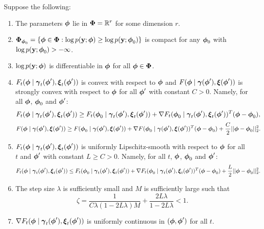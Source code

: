 \begin{theorem}

    Suppose the following:
    
    \begin{enumerate}
        \item The parameters $\bfphi$ lie in $\bfPhi = \bbR^r$ for some dimension $r$.
        \item $\bfPhi_{\bfphi_0} = \{\bfphi \in \bfPhi: \log p(\bfy;\bfphi) \geq \log p(\bfy;\bfphi_0)\}$ is compact for any  $\bfphi_0$ with $\log p(\bfy;\bfphi_0) > -\infty$.
        \item $\log p(\bfy;\bfphi)$ is differentiable in $\bfphi$ for all $\bfphi \in \bfPhi$.
        \item $F_t(\bfphi \mid \bfgamma_t(\bfphi'), \bfxi_t(\bfphi'))$ is convex with respect to $\bfphi$ and $F(\bfphi \mid \bfgamma(\bfphi'), \bfxi(\bfphi'))$ is strongly convex with respect to $\bfphi$ for all $\bfphi'$ with constant $C > 0$. Namely, for all $\bfphi$, $\bfphi_0$ and $\bfphi'$:
        \begin{equation}
            F_t(\bfphi \mid \bfgamma_t(\bfphi'), \bfxi_t(\bfphi')) \geq F_t(\bfphi_0 \mid \bfgamma_t(\bfphi'), \bfxi_t(\bfphi')) + \nabla F_t(\bfphi_0 \mid \bfgamma_t(\bfphi'), \bfxi_t(\bfphi'))^T(\bfphi-\bfphi_0),
        \end{equation}
        \begin{equation}
            F(\bfphi \mid \bfgamma(\bfphi'), \bfxi(\bfphi')) \geq F(\bfphi_0 \mid \bfgamma(\bfphi'), \bfxi(\bfphi')) + \nabla F(\bfphi_0 \mid \bfgamma(\bfphi'), \bfxi(\bfphi'))^T(\bfphi-\bfphi_0) + \frac{C}{2} ||\bfphi - \bfphi_0||_2^2.
        \end{equation}
        \item $F_t(\bfphi \mid \bfgamma_t(\bfphi'), \bfxi_t(\bfphi'))$ is uniformly Lipschitz-smooth with respect to $\bfphi$ for all $t$ and $\bfphi'$ with constant $L \geq C > 0$. Namely, for all $t$, $\bfphi$, $\bfphi_0$ and $\bfphi'$:
        \begin{equation}
            F_t(\bfphi \mid \bfgamma_t(\bfphi'), \bfxi_t(\bfphi')) \leq F_t(\bfphi_0 \mid \bfgamma_t(\bfphi'), \bfxi_t(\bfphi')) + \nabla F_t(\bfphi_0 \mid \bfgamma_t(\bfphi'), \bfxi_t(\bfphi'))^T(\bfphi - \bfphi_0) + \frac{L}{2} || \bfphi - \bfphi_0 ||_2^2.
        \end{equation}
        \item The step size $\lambda$ is sufficiently small and $M$ is sufficiently large such that
        \begin{equation}
            \zeta = \frac{1}{C \lambda(1-2L\lambda)M} + \frac{2L\lambda}{1-2L\lambda} < 1.
        \end{equation}
        \item $\nabla F_t(\bfphi \mid \bfgamma_t(\bfphi'), \bfxi_t(\bfphi'))$ is uniformly continuous in $(\bfphi,\bfphi')$ for all $t$.
    \end{enumerate}
    

\end{theorem}

